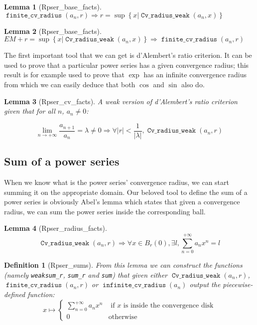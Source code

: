 \documentclass[submission,copyright]{eptcs}
\DeclareMathOperator{\cvrw}{\mathtt{Cv\_radius\_weak}}
\DeclareMathOperator{\fcvr}{\mathtt{finite\_cv\_radius}}
\DeclareMathOperator{\icvr}{\mathtt{infinite\_cv\_radius}}
\newtheorem{definition}{Definition}
\newtheorem{lemma}{Lemma}
\begin{document}
\begin{lemma}[Rpser\_base\_facts] $\fcvr{}(a_n,r) \Rightarrow r = \sup
\left\lbrace x | \cvrw{}(a_n, x) \right\rbrace$ \end{lemma}

\begin{lemma}[Rpser\_base\_facts] $EM + r = \sup \left\lbrace x |
\cvrw{}(a_n, x) \right\rbrace \Rightarrow \fcvr{}(a_n,r)$ \end{lemma}

The first important tool that we can get is d'Alembert's ratio criterion.
It can be used to prove that a particular power series has a given
convergence radius; this result is for example used to prove that $\exp$
has an infinite convergence radius from which we can easily deduce
that both $\cos$ and $\sin$ also do.

\begin{lemma}[Rpser\_cv\_facts] A weak version of d'Alembert's ratio
criterion given that for all $n$, $a_n \neq 0$:

$$\lim\limits_{n \to + \infty}\frac{a_{n+1}}{a_n} = \lambda \neq 0
  \Rightarrow \forall \left| r \right| < \frac{1}{\left| \lambda \right|
  }, \cvrw{}(a_n,r)$$
\end{lemma}

\subsection{Sum of a power series}

When we know what is the power series' convergence radius, we can start
summing it on the appropriate domain. Our beloved tool to define the sum
of a power series is obviously Abel's lemma which states that given a
convergence radius, we can sum the power series inside the corresponding
ball.

\begin{lemma}[Rpser\_radius\_facts] $$\cvrw{}(a_n,r) \Rightarrow
\forall x \in B_r(0), \exists l, \sum_{n=0}^{+\infty} a_n x^n = l$$
\end{lemma}

\begin{definition}[Rpser\_sums] From this lemma we can construct the functions
(namely \texttt{weaksum\_r}, \texttt{sum\_r} and \texttt{sum}) that given either
$\cvrw{}(a_n,r)$, $\fcvr{}(a_n,r)$ or $\icvr{}(a_n)$ output the piecewise-defined
function: $$x \mapsto \left\lbrace
\begin{array}{ll}
\sum_{n=0}^{+\infty} a_n x^n & \text{ if } x \text{ is inside the convergence
disk}\\
0 & \text{otherwise}
\end{array}\right.$$
\end{definition}
\end{document}
